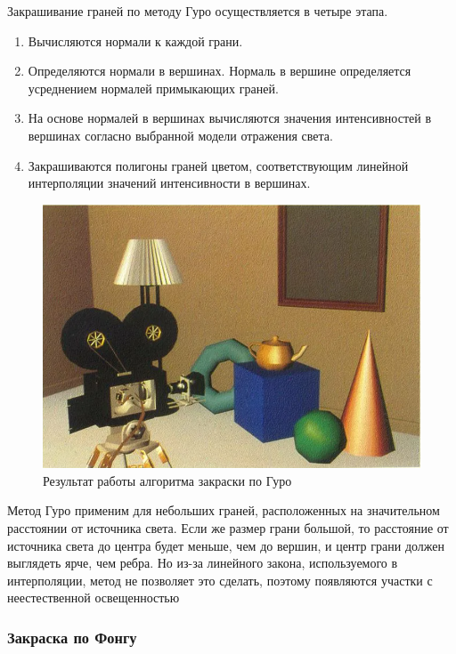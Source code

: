Закрашивание граней по методу Гуро осуществляется в четыре этапа.
\begin{enumerate}
	\item Вычисляются нормали к каждой грани.
	\item Определяются нормали в вершинах. Нормаль в вершине определяется усреднением нормалей примыкающих граней.
	\item На основе нормалей в вершинах вычисляются значения интенсивностей в вершинах согласно выбранной модели отражения света.
	\item Закрашиваются полигоны граней цветом, соответствующим линейной интерполяции значений интенсивности в вершинах.
\end{enumerate}

\begin{figure}[h]
	\centering
	\includegraphics[height=0.35\textheight]{img/guro.png}
	\caption{Результат работы алгоритма закраски по Гуро}
	\label{img:guro}
\end{figure}

Метод Гуро применим для небольших граней, расположенных на значительном расстоянии от источника света. Если же размер грани большой, то расстояние от источника света до центра будет меньше, чем до вершин, и центр грани должен выглядеть ярче, чем ребра. 
Но из-за линейного закона, используемого в интерполяции, метод не позволяет это сделать, поэтому появляются участки с неестественной освещенностью

\subsubsection{Закраска по Фонгу}

